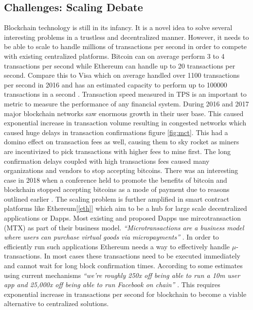 \subsection{Challenges: Scaling Debate}\label{scaling}
Blockchain technology is still in its infancy. It is a novel idea to solve several interesting problems in a trustless and decentralized manner. However, it needs to be able to scale to handle millions of transactions per second in order to compete with existing centralized platforms. Bitcoin can on average perform 3 to 4 transactions per second while Ethereum can handle up to 20 transactions per second. Compare this to Visa which on average handled over 1100 transactions per second in 2016 and has an estimated capacity to perform up to 100000 transactions in a second \cite{medium:003}. Transaction speed measured in TPS is an important to metric to measure the performance of any financial system. During 2016 and 2017 major blockchain networks saw enormous growth in their user base. This caused exponential increase in transaction volume resulting in congested networks which caused huge delays in transaction confirmations figure \ref{fig:mct}. This had a domino effect on transaction fees as well, causing them to sky rocket as miners are incentivized to pick transactions with higher fees to mine first. The long confirmation delays coupled with high transactions fees caused many organizations and vendors to stop accepting bitcoins. There was an interesting case in 2018 when a conference held to promote the benefits of bitcoin and blockchain stopped accepting bitcoins as a mode of payment due to reasons outlined earlier \cite{misc:022}.  The scaling problem is further amplified in smart contract platforms like Ethereum[\ref{eth}] which aim to be a hub for large scale decentralized applications or Dapps. Most existing and proposed Dapps use mircotransaction (MTX) as part of their business model. \textit{“Microtransactions are a business model where users can purchase virtual goods via micropayments”} \cite{wiki:007}. In order to efficiently run such applications Ethereum needs a way to effectively handle $\mu$-transactions. In most cases these transactions need to be executed immediately and cannot wait for long block confirmation times. According to some estimates using current mechanisms \textit{“we’re roughly 250x off being able to run a 10m user app and 25,000x off being able to run Facebook on chain”} \cite{medium:003}.  This requires exponential increase in transactions per second for blockchain to become a viable alternative to centralized solutions.
